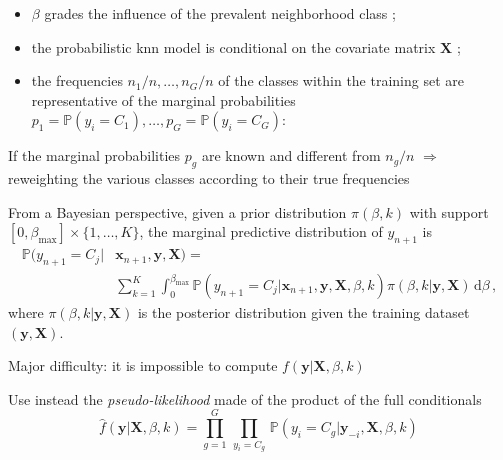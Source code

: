 \begin{slide}
\end{slide}\begin{slide}

\begin{itemize}
\item $\beta$ grades the influence of the prevalent neighborhood class ;

\item \pause the probabilistic knn model is conditional on the covariate matrix $\mathbf{X}$ ; 

\item \pause the frequencies $n_1/n,\ldots,n_G/n$ of the classes within the
training set are representative of the marginal
probabilities $p_1=\mathbb{P}(y_i=C_1),\ldots,p_G=\mathbb{P}(y_i=C_G)$: 
\end{itemize}

\vs \pause If the marginal probabilities $p_g$ are known and different from $n_g/n$ 
$\Longrightarrow$ reweighting the various classes according to their true frequencies

\end{slide}\begin{slide}

From a Bayesian perspective, given a prior distribution $\pi(\beta,k)$ with support
$[0,\beta_{\max{}}]\times\{1,\ldots,K\}$, the marginal predictive distribution of $y_{n+1}$ is
\begin{align*}
\mathbb{P}(y_{n+1}=C_j|&\mathbf{x}_{n+1},\mathbf{y},\mathbf{X})= \\
 &\sum_{k=1}^K\int_0^{\beta_{\max}} \mathbb{P}(y_{n+1}=C_j|
\mathbf{x}_{n+1},\mathbf{y},\mathbf{X},\beta,k)\pi(\beta,k|\mathbf{y},\mathbf{X})\,\text{d}\beta\,,
\end{align*}
where $\pi(\beta,k|\mathbf{y},\mathbf{X})$ is the posterior distribution given the training dataset
$(\mathbf{y},\mathbf{X})$. 

\end{slide}\begin{slide}

Major difficulty: it is impossible to compute $f(\mathbf{y}|\mathbf{X},\beta,k)$

\vs\pause Use instead the {\em pseudo-likelihood} made of
the product of the full conditionals
$$
\widehat{f}(\mathbf{y}|\mathbf{X},\beta,k) =
\prod_{g=1}^G\, \prod_{y_i=C_g}\, \mathbb{P}(y_i=C_g|\mathbf{y}_{-i},\mathbf{X},\beta,k)\,
$$


\end{slide}
